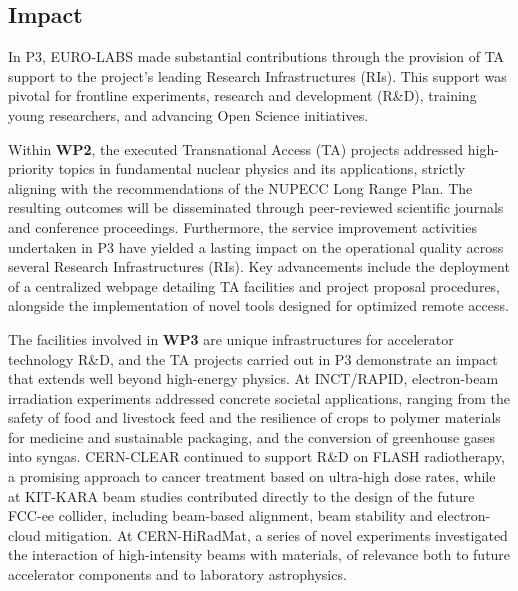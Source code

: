 
\subsection{Impact}
\label{sec:impact}



In P3, EURO-LABS made substantial contributions through the provision of TA support to the project's leading Research Infrastructures (RIs). This support was pivotal for frontline experiments, research and development (R\&D), training young researchers, and advancing Open Science initiatives.

Within \textbf{WP2}, the executed Transnational Access (TA) projects addressed high-priority topics in fundamental nuclear physics and its applications, strictly aligning with the recommendations of the NUPECC Long Range Plan. The resulting outcomes will be disseminated through peer-reviewed scientific journals and conference proceedings. Furthermore, the service improvement activities undertaken in P3 have yielded a lasting impact on the operational quality across several Research Infrastructures (RIs). Key advancements include the deployment of a centralized webpage detailing TA facilities and project proposal procedures, alongside the implementation of novel tools designed for optimized remote access.

The facilities involved in \textbf{WP3} are unique infrastructures for accelerator technology R\&D, and the TA projects carried out in P3 demonstrate an impact that extends well beyond high-energy physics. At INCT/RAPID, electron-beam irradiation experiments addressed concrete societal applications, ranging from the safety of food and livestock feed and the resilience of crops to polymer materials for medicine and sustainable packaging, and the conversion of greenhouse gases into syngas. CERN-CLEAR continued to support R\&D on FLASH radiotherapy, a promising approach to cancer treatment based on ultra-high dose rates, while at KIT-KARA beam studies contributed directly to the design of the future FCC-ee collider, including beam-based alignment, beam stability and electron-cloud mitigation. At CERN-HiRadMat, a series of novel experiments investigated the interaction of high-intensity beams with materials, of relevance both to future accelerator components and to laboratory astrophysics. 

